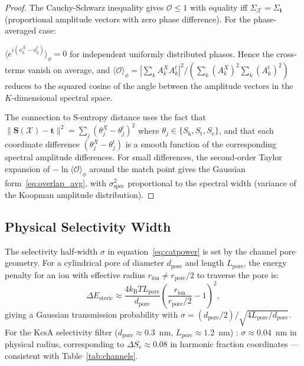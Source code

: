 \documentclass[11pt,twocolumn,a4paper]{article}
\theoremstyle{definition}
\theoremstyle{remark}
\newcommand{\kB}{k_{\mathrm{B}}}
\newcommand{\Sk}{S_{\mathrm{k}}}
\newcommand{\St}{S_{\mathrm{t}}}
\newcommand{\Se}{S_{\mathrm{e}}}
\newcommand{\Sent}{\bm{S}}
\begin{document}
\begin{proof}
The Cauchy-Schwarz inequality gives $\mathcal{O} \leq 1$ with equality iff
$\Sigma_{\mathcal{X}} = \Sigma_{\mathbf{t}}$ (proportional amplitude vectors
with zero phase difference). For the phase-averaged case:

$\langle e^{i(\phi_k^X - \phi_k^t)} \rangle_\phi = 0$ for independent
uniformly distributed phases. Hence the cross-terms vanish on average,
and $\langle \mathcal{O} \rangle_\phi = |\sum_k A_k^X A_k^t|^2 / (\sum_k
(A_k^X)^2 \sum_k (A_k^t)^2)$ reduces to the squared cosine of the angle
between the amplitude vectors in the $K$-dimensional spectral space.

The connection to S-entropy distance uses the fact that
$\|\Sent(\mathcal{X}) - \mathbf{t}\|^2 = \sum_j (\theta_j^X - \theta_j^t)^2$
where $\theta_j \in \{\Sk, \St, \Se\}$, and that each coordinate difference
$(\theta_j^X - \theta_j^t)$ is a smooth function of the corresponding spectral
amplitude differences. For small differences, the second-order Taylor expansion
of $-\ln\langle\mathcal{O}\rangle_\phi$ around the match point gives the
Gaussian form~\eqref{eq:overlap_avg}, with $\sigma_{\mathrm{spec}}^2$
proportional to the spectral width (variance of the Koopman amplitude
distribution).
\end{proof}

\subsection{Physical Selectivity Width}

The selectivity half-width $\sigma$ in equation~\eqref{eq:catpower}
is set by the channel pore geometry. For a cylindrical pore of diameter
$d_{\mathrm{pore}}$ and length $L_{\mathrm{pore}}$, the energy penalty for
an ion with effective radius $r_{\mathrm{ion}} \neq r_{\mathrm{pore}}/2$
to traverse the pore is:
\begin{equation}
\Delta E_{\mathrm{steric}} \approx \frac{4\kB T L_{\mathrm{pore}}}{d_{\mathrm{pore}}}
\left(\frac{r_{\mathrm{ion}}}{r_{\mathrm{pore}}/2} - 1\right)^2,
\label{eq:steric}
\end{equation}
giving a Gaussian transmission probability with
$\sigma = (d_{\mathrm{pore}}/2) / \sqrt{4L_{\mathrm{pore}}/d_{\mathrm{pore}}}$.
For the KcsA selectivity filter ($d_{\mathrm{pore}} \approx 0.3$~nm,
$L_{\mathrm{pore}} \approx 1.2$~nm) \citep{doyle1998}: $\sigma \approx 0.04$~nm
in physical radius, corresponding to $\Delta\Se \approx 0.08$ in harmonic
fraction coordinates --- consistent with Table~\ref{tab:channels}.
\end{document}

